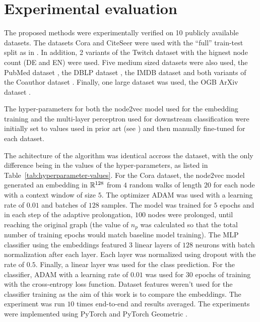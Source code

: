 \section{Experimental evaluation}\label{sec:experimental-evaluation}

The proposed methods were experimentally verified on 10 publicly available datasets. The datasets Cora and CiteSeer \cite{yang_revisiting_2016} were used with the \enquote{full} train-test split as in \cite{chen_fastgcn_2018}. In addition, 2 variants of the Twitch dataset \cite{rozemberczki_multi-scale_2021} with the hignest node count (DE and EN) were used. Five medium sized datasets were also used, the PubMed dataset \cite{yang_revisiting_2016}, the DBLP dataset \cite{bojchevski_deep_2018}, the IMDB dataset \cite{fu_magnn_2020} and both variants of the Coauthor dataset \cite{shchur_pitfalls_2019}. Finally, one large dataset was used, the OGB ArXiv dataset \cite{hu_open_2021}.

The hyper-parameters for both the node2vec model used for the embedding training and the multi-layer perceptron used for downstream classification were initially set to values used in prior art (see \cite{fey_fast_2019,hu_open_2021}) and then manually fine-tuned for each dataset.

The achitecture of the algorithm was identical accross the dataset, with the only difference being in the values of the hyper-parameters, as listed in Table~\ref{tab:hyperparameter-values}. For the Cora dataset, the node2vec model generated an embedding in \( \mathbb{R}^{128} \) from \( 4 \) random walks of length \( 20 \) for each node with a context window of size \( 5 \). The optimizer ADAM \cite{kingma_adam:_2017} was used with a learning rate of \( 0.01 \) and batches of \( 128 \) samples. The model was trained for \( 5 \) epochs and in each step of the adaptive prolongation, \( 100 \) nodes were prolonged, until reaching the original graph (the value of \( n_p \) was calculated so that the total number of training epochs would match baseline model training). The MLP classifier using the embeddings featured \( 3 \) linear layers of \( 128 \) neurons with batch normalization after each layer. Each layer was normalized using dropout \cite{srivastava_dropout_2014} with the rate of \( 0.5 \). Finally, a linear layer was used for the class prediction. For the classifier, ADAM with a learning rate of \( 0.01 \) was used for \( 30 \) epochs of training with the cross-entropy loss function. Dataset features weren't used for the classifier training as the aim of this work is to compare the embeddings. The experiment was run \( 10 \) times end-to-end and results averaged. The experiments were implemented using PyTorch \cite{paszke_pytorch_2019} and PyTorch Geometric \cite{fey_fast_2019}.

